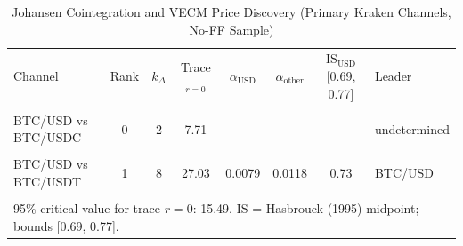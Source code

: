 \begin{table}[H]
\caption{Johansen Cointegration and VECM Price Discovery (Primary Kraken Channels, No-FF Sample)}
\label{tab:coint_vecm}
\footnotesize
\centering
\begin{tabular}{lccccccl}
\toprule
Channel & Rank & $k_\Delta$ & Trace$_{r=0}$ & $\alpha_{\text{USD}}$ & $\alpha_{\text{other}}$ & IS$_{\text{USD}}$ [0.69, 0.77] & Leader \\\\
\midrule
BTC/USD vs BTC/USDC & 0 & 2 & 7.71 & --- & --- & --- & undetermined \\\\
BTC/USD vs BTC/USDT & 1 & 8 & 27.03 & 0.0079 & 0.0118 & 0.73 & BTC/USD \\\\
\bottomrule
\multicolumn{8}{l}{\footnotesize 95\% critical value for trace $r=0$: 15.49. IS = Hasbrouck (1995) midpoint; bounds [0.69, 0.77].}
\end{tabular}
\end{table}
